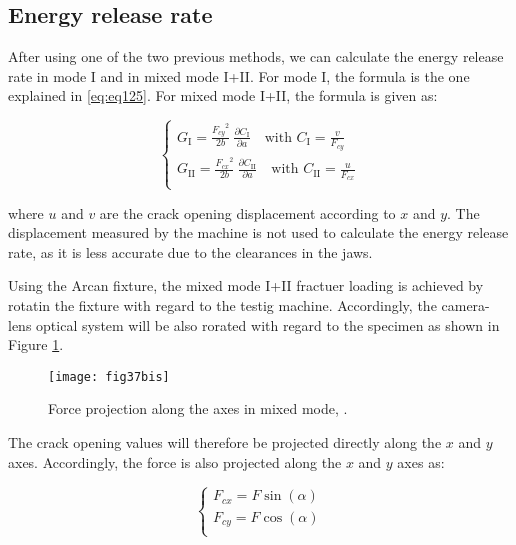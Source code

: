 \subsection{Energy release rate}

After using one of the two previous methods, we can calculate the energy release rate in mode I and in mixed mode I+II. For mode I, the formula is the one explained in \ref{eq:eq125}. For mixed mode I+II, the formula is given as:

\begin{equation}
	\begin{cases}
		G_\text{I}=\displaystyle\frac{{F_{cy}}^2}{2b}\ \frac{\partial C_\text{I}}{\partial a} \quad \text{with } C_\text{I}=\frac{v}{F_{cy}} \\
		G_\text{II}=\displaystyle\frac{{F_{cx}}^2}{2b}\ \frac{\partial C_\text{II}}{\partial a} \quad \text{with } C_\text{II}=\frac{u}{F_{cx}}\\
	\end{cases}
\label{eq:eq28}
\end{equation}

where $u$ and $v$ are the crack opening displacement according to $x$ and $y$. The displacement measured by the machine is not used to calculate the energy release rate, as it is less accurate due to the clearances in the jaws.

Using the Arcan fixture, the mixed mode I+II fractuer loading is achieved by rotatin the fixture with regard to the testig machine. Accordingly, the camera-lens optical system will be also rorated with regard to the specimen as shown in Figure \ref{fig:fig37bis}.

\begin{figure}[htp]
	\centering
	\texttt{[image: fig37bis]}
	\caption{Force projection along the axes in mixed mode, \citep{Odounga2018phd}.}
	\label{fig:fig37bis}
\end{figure}

The crack opening values will therefore be projected directly along the $x$ and $y$ axes.
Accordingly, the force is also projected along the $x$ and $y$ axes as:


\begin{equation}
	\begin{cases}
		F_{cx}=F \sin(\alpha) \\
		F_{cy}=F \cos(\alpha) \\ 
	\end{cases}
	\label{eq:eq29}
\end{equation}

